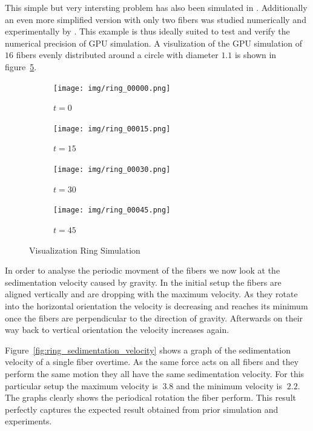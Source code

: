 \documentclass[a4paper,11pt]{kth-mag}
\begin{document}
This simple but very intersting problem has also been simulated in \cite{}. Additionally an even more simplified version with only two fibers was studied numerically and experimentally by \cite{}. This example is thus ideally suited to test and verify the numerical precision of GPU simulation. A visulization of the GPU simulation of $16$ fibers evenly distributed around a circle with diameter $1.1$ is shown in figure~\ref{fig:ring_simulation}.

\begin{figure}
  \centering
  \begin{subfigure}[h]{0.4\textwidth}
    \centering
    \texttt{[image: img/ring\_00000.png]}
    \caption{$t=0$}\label{fig:ring_simulation_1a}
  \end{subfigure}
  \begin{subfigure}[h]{0.4\textwidth}
    \centering
    \texttt{[image: img/ring\_00015.png]}
    \caption{$t=15$}\label{fig:ring_simulation_1b}
  \end{subfigure}
  \begin{subfigure}[h]{0.4\textwidth}
    \centering
    \texttt{[image: img/ring\_00030.png]}
    \caption{$t=30$}\label{fig:ring_simulation_1c}
  \end{subfigure}
  \begin{subfigure}[h]{0.4\textwidth}
    \centering
    \texttt{[image: img/ring\_00045.png]}
    \caption{$t=45$}\label{fig:ring_simulation_1d}
  \end{subfigure}
  \caption{Visualization Ring Simulation}
  \label{fig:ring_simulation}
\end{figure}

In order to analyse the periodic movment of the fibers we now look at the sedimentation velocity caused by gravity. In the initial setup the fibers are aligned vertically and are dropping with the maximum velocity. As they rotate into the horizontal orientation the velocity is decreasing and reaches its minimum once the fibers are perpendicular to the direction of gravity. Afterwards on their way back to vertical orientation the velocity increases again.

Figure~\ref{fig:ring_sedimentation_velocity} shows a graph of the sedimentation velocity of a single fiber overtime. As the same force acts on all fibers and they perform the same motion they all have the same sedimentation velocity. For this particular setup the maximum velocity is $~3.8$ and the minimum velocity is $~2.2$. The graphs clearly shows the periodical rotation the fiber perform. This result perfectly captures the expected result obtained from prior simulation and experiments.
\end{document}
